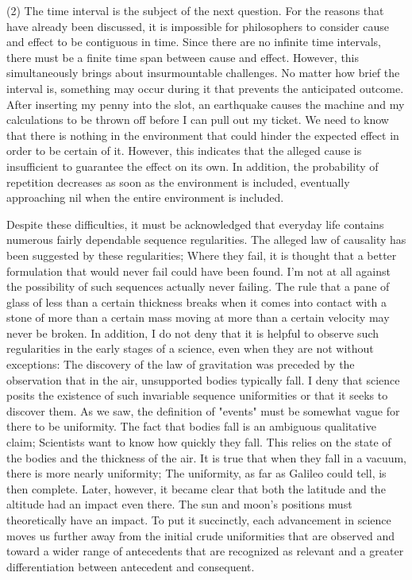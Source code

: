 \documentclass[a4paper,12pt]{book}[2004/02/16]
\theoremstyle{ilemma}
\theoremstyle{itheorem}
\theoremstyle{iother}
\theoremstyle{icorollary}
\theoremstyle{numcorollary}
\theoremstyle{idefinition}
\begin{document}
(2) The time interval is the subject of the next question. For the reasons that have already been discussed, it is impossible for philosophers to consider cause and effect to be contiguous in time. Since there are no infinite time intervals, there must be a finite time span between cause and effect. However, this simultaneously brings about insurmountable challenges. No matter how brief the interval is, something may occur during it that prevents the anticipated outcome. After inserting my penny into the slot, an earthquake causes the machine and my calculations to be thrown off before I can pull out my ticket. We need to know that there is nothing in the environment that could hinder the expected effect in order to be certain of it. However, this indicates that the alleged cause is insufficient to guarantee the effect on its own. In addition, the probability of repetition decreases as soon as the environment is included, eventually approaching nil when the entire environment is included.

Despite these difficulties, it must be acknowledged that everyday life contains numerous fairly dependable sequence regularities.
The alleged law of causality has been suggested by these regularities; Where they fail, it is thought that a better formulation that would never fail could have been found. I'm not at all against the possibility of such sequences actually never failing. The rule that a pane of glass of less than a certain thickness breaks when it comes into contact with a stone of more than a certain mass moving at more than a certain velocity may never be broken. In addition, I do not deny that it is helpful to observe such regularities in the early stages of a science, even when they are not without exceptions: The discovery of the law of gravitation was preceded by the observation that in the air, unsupported bodies typically fall. I deny that science posits the existence of such invariable sequence uniformities or that it seeks to discover them. As we saw, the definition of "events" must be somewhat vague for there to be uniformity. The fact that bodies fall is an ambiguous qualitative claim; Scientists want to know how quickly they fall. This relies on the state of the bodies and the
thickness of the air. It is true that when they fall in a vacuum, there is more nearly uniformity; The uniformity, as far as Galileo could tell, is then complete. Later, however, it became clear that both the latitude and the altitude had an impact even there. The sun and moon's positions must theoretically have an impact. To put it succinctly, each advancement in science moves us further away from the initial crude uniformities that are observed and toward a wider range of antecedents that are recognized as relevant and a greater differentiation between antecedent and consequent.
\end{document}
